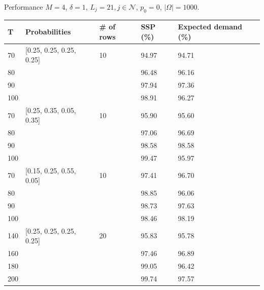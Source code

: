 \begin{frame}{Performance}
    $M =4$, $\delta =1$, $L_j =21, j \in \mathcal{N}$, $p_0 = 0$, $|\Omega| = 1000$.
    \begin{table}[ht]
      \centering
      \begin{tabular}{|l|l|l|l|l|}
      \hline
       T & Probabilities & \# of rows & SSP (\%) & Expected demand (\%) \\
      \hline
      70  & [0.25, 0.25, 0.25, 0.25]  & 10 & 94.97 & 94.71  \\
      80  &   &  & 96.48 & 96.16  \\
      90  &   &  & 97.94 & 97.36  \\
      100  &   &  & 98.91 & 96.27  \\
      \hline
      70  & [0.25, 0.35, 0.05, 0.35]  & 10 & 95.90 & 95.60 \\
      80  &   &  & 97.06 & 96.69 \\
      90  &   &  & 98.58 & 98.58 \\
      100  &   &  & 99.47 & 95.97 \\
      \hline
      70  & [0.15, 0.25, 0.55, 0.05]  & 10 & 97.41 & 96.70 \\
      80  &   &  & 98.85 & 96.06 \\
      90  &   &  & 98.73 & 97.63 \\
      100  &   &  & 98.46 & 98.19 \\
      \hline
      140  & [0.25, 0.25, 0.25, 0.25]  & 20 & 95.83 & 95.78 \\
      160  &   &  & 97.46 & 96.89 \\
      180  &   &  & 99.05 & 96.42 \\
      200  &   &  & 99.74 & 97.57 \\
      \hline
      \end{tabular}
    \end{table}

  \end{frame}

